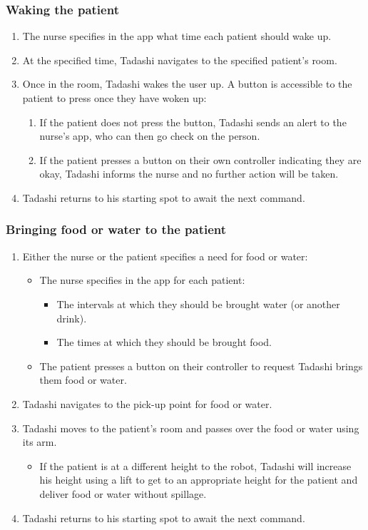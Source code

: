 \documentclass{article}
\begin{document}
\subsubsection{Waking the patient}
\begin{enumerate}
\item The nurse specifies in the app what time each patient should wake up.
\item At the specified time, Tadashi navigates to the specified patient's room.
\item Once in the room, Tadashi wakes the user up. A button is accessible to the patient to press once they have woken up:
  \begin{enumerate} 
  \item If the patient does not press the button, Tadashi sends an alert to the nurse's app, who can then go check on the person. 
  \item If the patient presses a button on their own controller indicating they are okay, Tadashi informs the nurse and no further action will be taken.
  \end{enumerate}
\item Tadashi returns to his starting spot to await the next command. 
\end{enumerate}

\subsubsection{Bringing food or water to the patient}
\begin{enumerate}
\item Either the nurse or the patient specifies a need for food or water:
  \begin{itemize}
  \item The nurse specifies in the app for each patient:
    \begin{itemize}
    \item The intervals at which they should be brought water (or another drink).
    \item The times at which they should be brought food.
    \end{itemize}
  \item The patient presses a button on their controller to request Tadashi brings them food or water. 
  \end{itemize}
\item Tadashi navigates to the pick-up point for food or water.
\item Tadashi moves to the patient's room and passes over the food or water using its arm.
  \begin{itemize}
  \item If the patient is at a different height to the robot, Tadashi will increase his height using a lift to get to an appropriate height for the patient and deliver food or water without spillage. 
  \end{itemize}
\item Tadashi returns to his starting spot to await the next command.
\end{enumerate}
\end{document}
